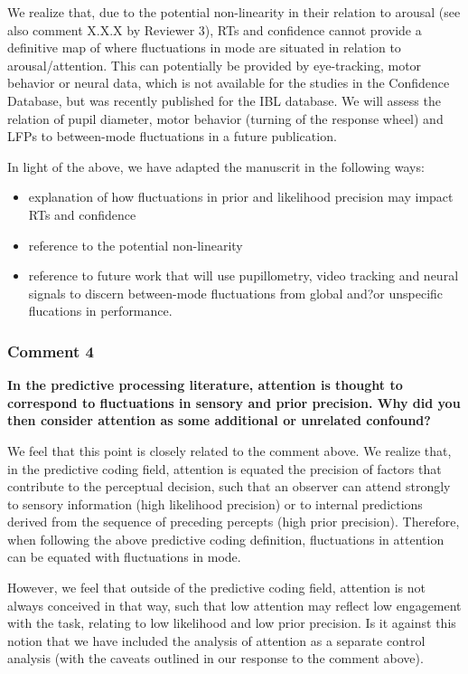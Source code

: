 \documentclass[
]{article}
\begin{document}
We realize that, due to the potential non-linearity in their relation to
arousal (see also comment X.X.X by Reviewer 3), RTs and confidence
cannot provide a definitive map of where fluctuations in mode are
situated in relation to arousal/attention. This can potentially be
provided by eye-tracking, motor behavior or neural data, which is not
available for the studies in the Confidence Database, but was recently
published for the IBL database. We will assess the relation of pupil
diameter, motor behavior (turning of the response wheel) and LFPs to
between-mode fluctuations in a future publication.

In light of the above, we have adapted the manuscrit in the following
ways:

\begin{itemize}
\item
  explanation of how fluctuations in prior and likelihood precision may
  impact RTs and confidence
\item
  reference to the potential non-linearity
\item
  reference to future work that will use pupillometry, video tracking
  and neural signals to discern between-mode fluctuations from global
  and?or unspecific flucations in performance.
\end{itemize}

\hypertarget{comment-4}{%
\subsubsection{Comment 4}\label{comment-4}}

\textbf{In the predictive processing literature, attention is thought to
correspond to fluctuations in sensory and prior precision. Why did you
then consider attention as some additional or unrelated confound?}

We feel that this point is closely related to the comment above. We
realize that, in the predictive coding field, attention is equated the
precision of factors that contribute to the perceptual decision, such
that an observer can attend strongly to sensory information (high
likelihood precision) or to internal predictions derived from the
sequence of preceding percepts (high prior precision). Therefore, when
following the above predictive coding definition, fluctuations in
attention can be equated with fluctuations in mode.

However, we feel that outside of the predictive coding field, attention
is not always conceived in that way, such that low attention may reflect
low engagement with the task, relating to low likelihood and low prior
precision. Is it against this notion that we have included the analysis
of attention as a separate control analysis (with the caveats outlined
in our response to the comment above).
\end{document}
